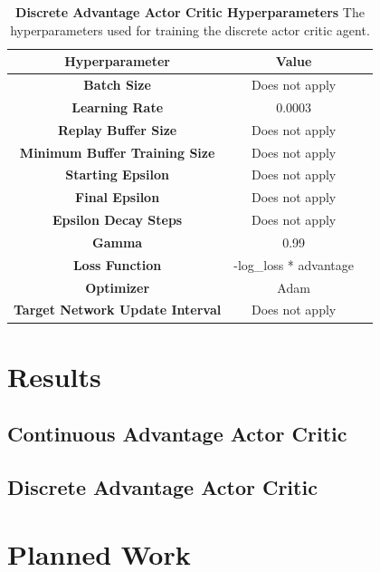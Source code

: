\documentclass[conference]{IEEEtran}
\begin{document}
\begin{table}[htbp]
    \caption{\textbf{Discrete Advantage Actor Critic Hyperparameters}  The hyperparameters used for training the discrete actor critic agent.}
\begin{center}
\begin{tabular}{|c|c|c|}
\hline
\textbf{Hyperparameter} & \textbf{Value} \\
\hline
\textbf{Batch Size} & Does not apply \\
\hline
\textbf{Learning Rate} & 0.0003\\
\hline
\textbf{Replay Buffer Size} & Does not apply \\
\hline
\textbf{Minimum Buffer Training Size} & Does not apply \\
\hline
\textbf{Starting Epsilon} & Does not apply \\
\hline
\textbf{Final Epsilon} & Does not apply \\
\hline
\textbf{Epsilon Decay Steps} & Does not apply \\
\hline
\textbf{Gamma} & 0.99\\
\hline
\textbf{Loss Function} &  -log\_loss * advantage \\
\hline
\textbf{Optimizer} & Adam \\
\hline
\textbf{Target Network Update Interval} & Does not apply \\
\hline
\end{tabular}
\label{table:discreteActorCriticHypers}
\end{center}
\end{table}

\section{Results} \label{results}

\subsection{Continuous Advantage Actor Critic}

\subsection{Discrete Advantage Actor Critic}

\section{Planned Work} \label{planned}
\end{document}
